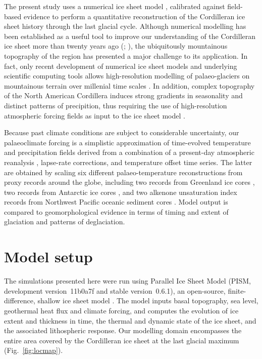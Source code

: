 \documentclass[tc, manuscript]{copernicus}
\begin{document}
The present study uses a numerical ice sheet model \citep{PISM-authors.2014},
calibrated against field-based evidence to perform a quantitative
reconstruction of the Cordilleran ice sheet history through the last glacial
cycle. Although numerical modelling has been established as a useful tool to
improve our understanding of the Cordilleran ice sheet more than twenty years
ago (\citealp[p.~227]{Jackson.Clague.1991}; \citealp{Robert.1991}), the
ubiquitously mountainous
topography of the region has presented a major challenge to its application.
In fact, only recent development of numerical ice sheet models and underlying
scientific computing tools \citep{Bueler.Brown.2009, Balay.etal.2014} allows
high-resolution modelling of palaeo-glaciers on mountainous terrain
over millenial time scales \citep{Golledge.etal.2012}. In addition, complex
topography of the North American Cordillera induces strong gradients in
seasonality and distinct patterns of precipition, thus requiring the use of
high-resolution atmospheric forcing fields as input to the ice sheet model
\citep{Seguinot.etal.2013}.

Because past climate conditions are subject to considerable uncertainty, our
palaeoclimate forcing is a simplistic approximation of time-evolved temperature
and precipitation fields derived from a combination of a present-day
atmospheric reanalysis \citep{Mesinger.etal.2006}, lapse-rate corrections,
and temperature offset time series. The latter are obtained by scaling six
different palaeo-temperature reconstructions from proxy records around the
globe, including two  records from Greenland ice cores
\citep{Dansgaard.etal.1993, Andersen.etal.2004}, two 
records from Antarctic ice cores \citep{Petit.etal.1999,Jouzel.etal.2007},
and two alkenone unsaturation index records from Northwest Pacific oceanic
sediment cores \citep{Herbert.etal.2001}. Model output is compared to
geomorphological evidence in terms of timing and extent of glaciation and
patterns of deglaciation.


\section{Model setup}
\label{sec:model}

The simulations presented here were run using Parallel Ice Sheet Model (PISM,
development version~11b0a7f and stable version~0.6.1), an open-source,
finite-difference, shallow ice sheet model \citep{PISM-authors.2014}.
The model inputs basal topography, sea level, geothermal
heat flux and climate forcing, and computes the evolution of ice extent
and thickness in time, the thermal and dynamic state of the ice sheet, and
the associated lithospheric response. Our modelling domain encompasses the
entire area covered by the Cordilleran ice sheet at the last glacial maximum
(Fig.~\ref{fig:locmap}).
\end{document}
